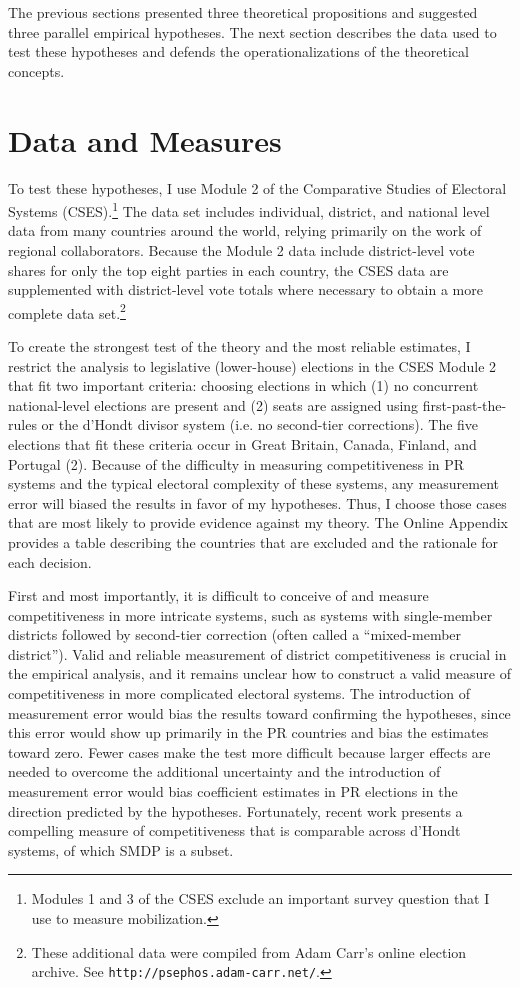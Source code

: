 \documentclass[12pt]{article}
\begin{document}
The previous sections presented three theoretical propositions and suggested three parallel empirical hypotheses. The next section describes the data used to test these hypotheses and defends the operationalizations of the theoretical concepts. 

\section*{Data and Measures}

To test these hypotheses, I use Module 2 of the Comparative Studies of Electoral Systems (CSES).\footnote{Modules 1 and 3 of the CSES exclude an important survey question that I use to measure mobilization.} The data set includes individual, district, and national level data from many countries around the world, relying primarily on the work of regional collaborators. Because the Module 2 data include district-level vote shares for only the top eight parties in each country, the CSES data are supplemented with district-level vote totals where necessary to obtain a more complete data set.\footnote{These additional data were compiled from Adam Carr's online election archive. See \texttt{http://psephos.adam-carr.net/}.}

To create the strongest test of the theory and the most reliable estimates, I restrict the analysis to legislative (lower-house) elections in the CSES Module 2 that fit two important criteria: choosing elections in which (1) no concurrent national-level elections are present and (2) seats are assigned using first-past-the-rules or the d'Hondt divisor system (i.e. no second-tier corrections). The five elections that fit these criteria occur in Great Britain, Canada, Finland, and Portugal (2). Because of the difficulty in measuring competitiveness in PR systems and the typical electoral complexity of these systems, any measurement error will biased the results in favor of my hypotheses. Thus, I choose those cases that are most likely to provide evidence against my theory. The Online Appendix provides a table describing the countries that are excluded and the rationale for each decision.

First and most importantly, it is difficult to conceive of and measure competitiveness in more intricate systems, such as systems with single-member districts followed by second-tier correction (often called a ``mixed-member district''). Valid and reliable measurement of district competitiveness is crucial in the empirical analysis, and it remains unclear how to construct a valid measure of competitiveness in more complicated electoral systems. The introduction of measurement error would bias the results toward confirming the hypotheses, since this error would show up primarily in the PR countries and bias the estimates toward zero. Fewer cases make the test more difficult because larger effects are needed to overcome the additional uncertainty and the introduction of measurement error would bias coefficient estimates in PR elections in the direction predicted by the hypotheses. Fortunately, recent work \citep{GrofmanSelb2009} presents a compelling measure of competitiveness that is comparable across d'Hondt systems, of which SMDP is a subset. 
\end{document}
